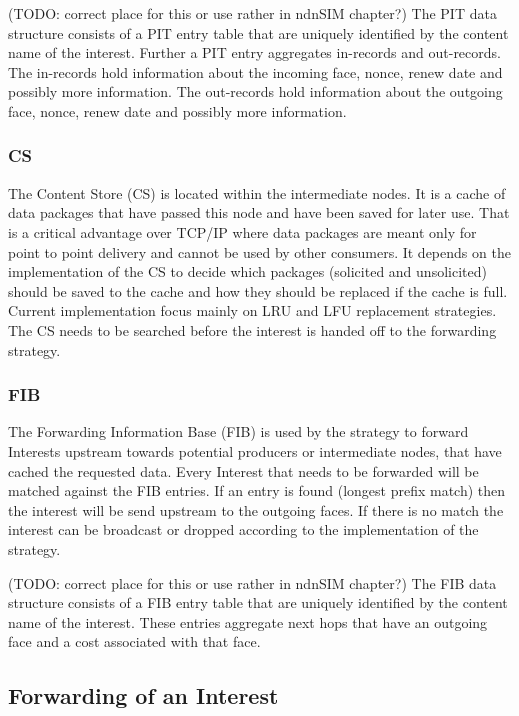 (TODO: correct place for this or use rather in ndnSIM chapter?) The PIT data structure consists of a PIT entry table that are uniquely identified by the content name of the interest. Further a PIT entry aggregates in-records and out-records. The in-records hold information about the incoming face, nonce, renew date and possibly more information. The out-records hold information about the outgoing face, nonce, renew date and possibly more information.

\subsubsection{CS} 

The Content Store (CS) is located within the intermediate nodes. It is a cache of data packages that have passed this node and have been saved for later use. That is a critical advantage over TCP/IP where data packages are meant only for point to point delivery and cannot be used by other consumers. It depends on the implementation of the CS to decide which packages (solicited and unsolicited) should be saved to the cache and how they should be replaced if the cache is full. Current implementation focus mainly on LRU and LFU replacement strategies. The CS needs to be searched before the interest is handed off to the forwarding strategy.

\subsubsection{FIB}

The Forwarding Information Base (FIB) is used by the strategy to forward Interests upstream towards potential producers or intermediate nodes, that have cached the requested data. Every Interest that needs to be forwarded will be matched against the FIB entries. If an entry is found (longest prefix match) then the interest will be send upstream to the outgoing faces. If there is no match the interest can be broadcast or dropped according to the implementation of the strategy.

(TODO: correct place for this or use rather in ndnSIM chapter?) The FIB data structure consists of a FIB entry table that are uniquely identified by the content name of the interest. These entries aggregate next hops that have an outgoing face and a cost associated with that face.

\subsection{Forwarding of an Interest}

